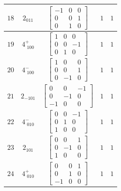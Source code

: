 \documentclass[fleqn,8pt]{jsarticle}
\begin{document}
\begin{longtable}{ccccc}
$ 18 $ & $ 2{}_{011} $ & $ \begin{bmatrix} -1 & 0 & 0 \\ 0 & 0 & 1 \\ 0 & 1 & 0 \end{bmatrix} $ & $ 1 $ & $ 1 $ \\ \hline
$ 19 $ & $ 4^{+}_{\,\,100} $ & $ \begin{bmatrix} 1 & 0 & 0 \\ 0 & 0 & -1 \\ 0 & 1 & 0 \end{bmatrix} $ & $ 1 $ & $ 1 $ \\ \hline
$ 20 $ & $ 4^{-}_{\,\,100} $ & $ \begin{bmatrix} 1 & 0 & 0 \\ 0 & 0 & 1 \\ 0 & -1 & 0 \end{bmatrix} $ & $ 1 $ & $ 1 $ \\ \hline
$ 21 $ & $ 2{}_{-101} $ & $ \begin{bmatrix} 0 & 0 & -1 \\ 0 & -1 & 0 \\ -1 & 0 & 0 \end{bmatrix} $ & $ 1 $ & $ 1 $ \\ \hline
$ 22 $ & $ 4^{-}_{\,\,010} $ & $ \begin{bmatrix} 0 & 0 & -1 \\ 0 & 1 & 0 \\ 1 & 0 & 0 \end{bmatrix} $ & $ 1 $ & $ 1 $ \\ \hline
$ 23 $ & $ 2{}_{101} $ & $ \begin{bmatrix} 0 & 0 & 1 \\ 0 & -1 & 0 \\ 1 & 0 & 0 \end{bmatrix} $ & $ 1 $ & $ 1 $ \\ \hline
$ 24 $ & $ 4^{+}_{\,\,010} $ & $ \begin{bmatrix} 0 & 0 & 1 \\ 0 & 1 & 0 \\ -1 & 0 & 0 \end{bmatrix} $ & $ 1 $ & $ 1 $ \\
\end{longtable}
\end{document}
